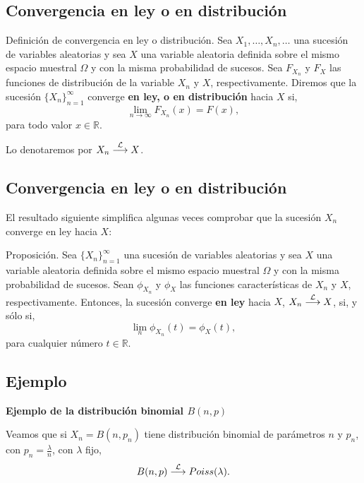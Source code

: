 \documentclass[]{book}
\begin{document}
\hypertarget{convergencia-en-ley-o-en-distribuciuxf3n}{%
\subsection{Convergencia en ley o en distribución}\label{convergencia-en-ley-o-en-distribuciuxf3n}}

 Definición de convergencia en ley o distribución.
Sea \(X_1,\ldots,X_n,\ldots\) una sucesión de variables aleatorias y sea \(X\) una variable aleatoria definida sobre el mismo espacio muestral \(\Omega\) y con la misma probabilidad de sucesos. Sea \(F_{X_n}\) y \(F_X\) las funciones de distribución de la variable \(X_n\) y \(X\), respectivamente. Diremos que la sucesión \(\{X_n\}_{n=1}^\infty\) converge \textbf{en ley, o en distribución} hacia \(X\) si,
\[
\lim_{n\to\infty} F_{X_n}(x)=F(x),
\]
para todo valor \(x\in\mathbb{R}\).

Lo denotaremos por \(X_n\stackrel{{\cal L}}{\longrightarrow}X\).

\hypertarget{convergencia-en-ley-o-en-distribuciuxf3n-1}{%
\subsection{Convergencia en ley o en distribución}\label{convergencia-en-ley-o-en-distribuciuxf3n-1}}

El resultado siguiente simplifica algunas veces comprobar que la sucesión \(X_n\) converge en ley hacia \(X\):

 Proposición.
Sea \(\{X_n\}_{n=1}^\infty\) una sucesión de variables aleatorias y sea \(X\) una variable aleatoria definida sobre el mismo espacio muestral \(\Omega\) y con la misma probabilidad de sucesos. Sean \(\phi_{X_n}\) y \(\phi_X\) las funciones características de \(X_n\) y \(X\), respectivamente. Entonces, la sucesión converge \textbf{en ley} hacia \(X\), \(X_n\stackrel{{\cal L}}{\longrightarrow}X\), si, y sólo si,
\[
\lim_{n} \phi_{X_n}(t) = \phi_X(t),
\]
para cualquier número \(t\in\mathbb{R}\).

\hypertarget{ejemplo-141}{%
\subsection{Ejemplo}\label{ejemplo-141}}

\textbf{Ejemplo de la distribución binomial \(B(n,p)\)}

Veamos que si \(X_n=B(n,p_n)\) tiene distribución binomial de parámetros \(n\) y \(p_n\), con \(p_n=\frac{\lambda}{n}\), con \(\lambda\) fijo,
\[
B(n,p)\stackrel{{\cal L}}{\longrightarrow}Poiss(\lambda).
\]
\end{document}
